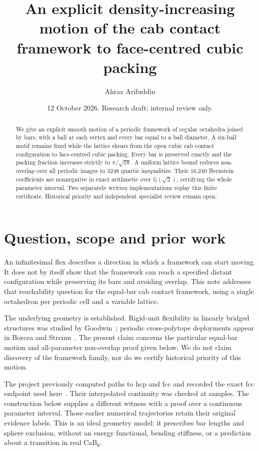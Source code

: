 \documentclass[11pt]{amsart}
\title[An explicit cab-to-fcc motion]{An explicit density-increasing motion of the cab contact framework to face-centred cubic packing}
\author{Ahraz Arifuddin}
\date{12 October 2026. Research draft; internal review only.}
\theoremstyle{remark}
\newcommand{\Q}{\mathbb Q}
\begin{document}
\begin{abstract}
We give an explicit smooth motion of a periodic framework of regular octahedra joined by bars, with a ball at each vertex and every bar equal to a ball diameter. A six-ball motif remains fixed while the lattice shears from the open cubic cab contact configuration to face-centred cubic packing. Every bar is preserved exactly and the packing fraction increases strictly to $\pi/\sqrt{18}$. A uniform lattice bound reduces non-overlap over all periodic images to 3248 quartic inequalities. Their 16,240 Bernstein coefficients are nonnegative in exact arithmetic over $\Q(\sqrt2)$, certifying the whole parameter interval. Two separately written implementations replay this finite certificate. Historical priority and independent specialist review remain open.
\end{abstract}
\maketitle

\section{Question, scope and prior work}

An infinitesimal flex describes a direction in which a framework can start moving. It does not by itself show that the framework can reach a specified distant configuration while preserving its bars and avoiding overlap. This note addresses that reachability question for the equal-bar cab contact framework, using a single octahedron per periodic cell and a variable lattice.

The underlying geometry is established. Rigid-unit flexibility in linearly bridged structures was studied by Goodwin~\cite{Goodwin}; periodic cross-polytope deployments appear in Borcea and Streinu~\cite[Section~7]{BorceaStreinu}. The present claim concerns the particular equal-bar motion and all-parameter non-overlap proof given below. We do not claim discovery of the framework family, nor do we certify historical priority of this motion.

The project previously computed paths to hcp and fcc and recorded the exact fcc endpoint used here~\cite{Repository}. Their interpolated continuity was checked at samples. The construction below supplies a different witness with a proof over a continuous parameter interval. Those earlier numerical trajectories retain their original evidence labels. This is an ideal geometry model: it prescribes bar lengths and sphere exclusion, without an energy functional, bending stiffness, or a prediction about a transition in real CaB$_6$.
\end{document}
